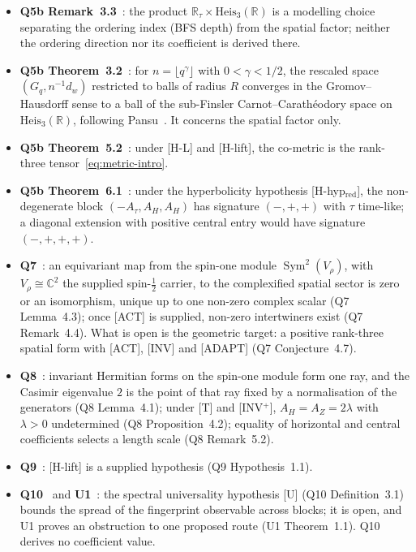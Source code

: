\documentclass[12pt,a4paper]{article}
\DeclareMathOperator{\Sym}{Sym}
\newcommand{\Heis}{\mathrm{Heis}}
\begin{document}
      \begin{itemize}
        \item \textbf{Q5b Remark~3.3}~\cite{Beau2026q5b}: the product $\mathbb{R}_\tau\times\Heis_3(\mathbb{R})$
        is a modelling choice separating the ordering index (BFS depth) from the spatial factor; neither the ordering
        direction nor its coefficient is derived there.
        \item \textbf{Q5b Theorem~3.2}~\cite{Beau2026q5b}: for $n = \lfloor q^\gamma\rfloor$ with $0<\gamma<1/2$,
        the rescaled space $(G_q, n^{-1}d_w)$ restricted to balls of radius $R$ converges in the Gromov--Hausdorff
        sense to a ball of the sub-Finsler Carnot--Carath\'eodory space on $\Heis_3(\mathbb{R})$, following
        Pansu~\cite{Pansu1983}.
        It concerns the spatial factor only.
        \item \textbf{Q5b Theorem~5.2}~\cite{Beau2026q5b}: under [H-L] and [H-lift], the co-metric is the rank-three
        tensor~\eqref{eq:metric-intro}.
        \item \textbf{Q5b Theorem~6.1}~\cite{Beau2026q5b}: under the hyperbolicity hypothesis
        [H-hyp$_{\mathrm{red}}$], the non-degenerate block $(-A_\tau, A_H, A_H)$ has signature $(-,+,+)$ with $\tau$
        time-like; a diagonal extension with positive central entry would have signature $(-,+,+,+)$.
        \item \textbf{Q7}~\cite{Beau2026q7}: an equivariant map from the spin-one module $\Sym^2(V_\rho)$, with
        $V_\rho\cong\mathbb{C}^2$ the supplied spin-$\tfrac12$ carrier, to the
        complexified spatial sector is zero or an isomorphism, unique up to one non-zero complex scalar (Q7
        Lemma~4.3); once [ACT] is supplied, non-zero intertwiners exist (Q7 Remark~4.4).
        What is open is the geometric target: a positive rank-three spatial form with [ACT], [INV] and [ADAPT]
        (Q7 Conjecture~4.7).
        \item \textbf{Q8}~\cite{BeauQ8}: invariant Hermitian forms on the spin-one module form one ray, and the
        Casimir eigenvalue $2$ is the point of that ray fixed by a normalisation of the generators (Q8 Lemma~4.1);
        under [T] and [INV$^+$], $A_H = A_Z = 2\lambda$ with $\lambda>0$ undetermined (Q8 Proposition~4.2);
        equality of horizontal and central coefficients selects a length scale (Q8 Remark~5.2).
        \item \textbf{Q9}~\cite{Beau2026q9}: [H-lift] is a supplied hypothesis (Q9 Hypothesis~1.1).
        \item \textbf{Q10}~\cite{Beau2026q10} and \textbf{U1}~\cite{Beau2026u1}: the spectral universality hypothesis
        [U] (Q10 Definition~3.1) bounds the spread of the fingerprint observable across blocks; it is open, and
        U1 proves an obstruction to one proposed route (U1 Theorem~1.1).
        Q10 derives no coefficient value.
      \end{itemize}
\end{document}
